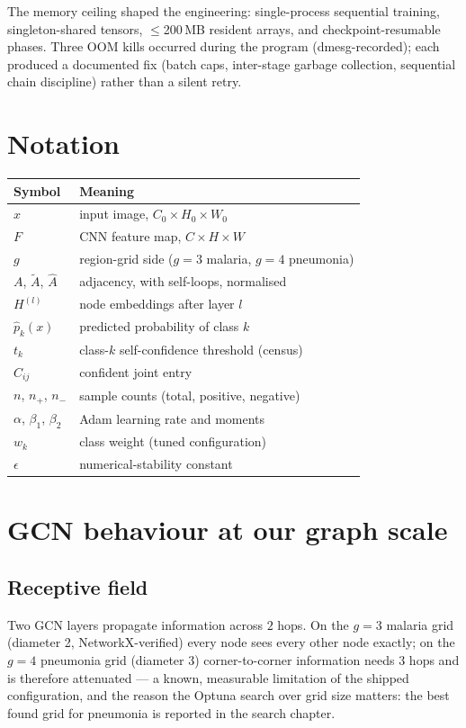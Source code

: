 The memory ceiling shaped the engineering: single-process sequential
training, singleton-shared tensors, $\leq$200\,MB resident arrays, and
checkpoint-resumable phases. Three OOM kills occurred during the program
(dmesg-recorded); each produced a documented fix (batch caps, inter-stage
garbage collection, sequential chain discipline) rather than a silent
retry.

\section{Notation}
\begin{longtable}{l p{9cm}}
\hline Symbol & Meaning \\ \hline \endhead
$x$ & input image, $C_0 \times H_0 \times W_0$ \\
$F$ & CNN feature map, $C \times H \times W$ \\
$g$ & region-grid side ($g=3$ malaria, $g=4$ pneumonia) \\
$A$, $\tilde A$, $\hat A$ & adjacency, with self-loops, normalised \\
$H^{(l)}$ & node embeddings after layer $l$ \\
$\hat p_k(x)$ & predicted probability of class $k$ \\
$t_k$ & class-$k$ self-confidence threshold (census) \\
$C_{ij}$ & confident joint entry \\
$n$, $n_+$, $n_-$ & sample counts (total, positive, negative) \\
$\alpha$, $\beta_1$, $\beta_2$ & Adam learning rate and moments \\
$w_k$ & class weight (tuned configuration) \\
$\epsilon$ & numerical-stability constant \\
\hline
\end{longtable}

\section{GCN behaviour at our graph scale}
\subsection{Receptive field}
Two GCN layers propagate information across $2$ hops. On the $g=3$
malaria grid (diameter 2, NetworkX-verified) every node sees every other
node exactly; on the $g=4$ pneumonia grid (diameter 3) corner-to-corner
information needs 3 hops and is therefore attenuated --- a known,
measurable limitation of the shipped configuration, and the reason the
Optuna search over grid size matters: the best found grid for pneumonia
is reported in the search chapter.
